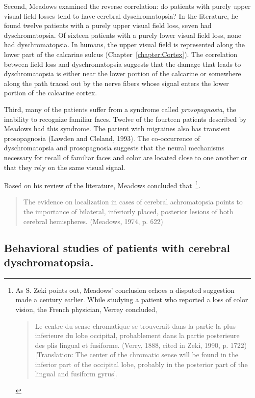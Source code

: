 Second, Meadows examined the reverse correlation: do patients with
purely upper visual field losses tend to have cerebral
dyschromatopsia?  In the literature, he found twelve patients with a
purely upper visual field loss, seven had dyschromatopsia.  Of sixteen
patients with a purely lower visual field loss, none had
dyschromatopsia.  In humans, the upper visual field is represented
along the lower part of the calcarine sulcus
(Chapter~\ref{chapter:Cortex}).  The correlation between field loss
and dyschromatopsia suggests that the damage that leads to
dyschromatopsia is either near the lower portion of the calcarine or
somewhere along the path traced out by the nerve fibers whose signal
enters the lower portion of the calcarine cortex.

Third, many of the patients suffer from a syndrome called {\em
prosopagnosia}, the inability to recognize familiar faces.  Twelve of
the fourteen patients described by Meadows had this syndrome.  The
patient with migraines also has transient prosopagnosia (Lawden and
Cleland, 1993).  The co-occurrence of dyschromatopsia and
prosopagnosia suggests that the neural mechanisms necessary for recall
of familiar faces and color are located close to one another or that they
rely on the same visual signal.

Based on his review of the literature, Meadows concluded
that~\footnote{ As S. Zeki points out, Meadows' conclusion echoes a
disputed suggestion made a century earlier.  While studying a patient
who reported a loss of color vision, the French physician, Verrey
concluded,
\begin{quote}
Le centre du sense chromatique se trouverait dans la partie la plus
inferieure du lobe occipital, probablement dans la partie posterieure
des plis lingual et fusiforme.  (Verry, 1888, cited in Zeki, 1990,
p. 1722) [Translation: The center of the chromatic sense will be found
in the inferior part of the occipital lobe, probably in the posterior
part of the lingual and fusiform gyrus].
\end{quote}
}.
\begin{quote}
The evidence on localization in cases of cerebral achromatopsia points
to the importance of bilateral, inferiorly placed, posterior lesions
of both cerebral hemispheres. (Meadows, 1974, p. 622)
\end{quote}

\subsection*{Behavioral studies of patients with cerebral dyschromatopsia.  }

